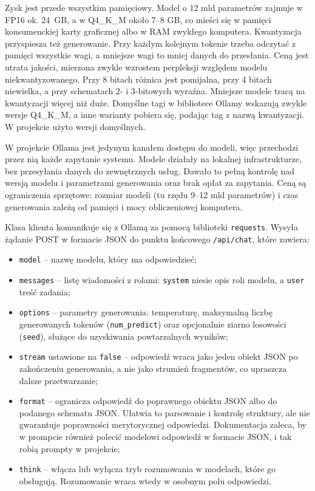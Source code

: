 Zysk jest przede wszystkim pamięciowy. Model o 12 mld parametrów zajmuje w FP16 ok. 24~GB, a w Q4\_K\_M około 7--8 GB, co mieści się w pamięci konsumenckiej karty graficznej albo w RAM zwykłego komputera. Kwantyzacja przyspiesza też generowanie. Przy każdym kolejnym tokenie trzeba odczytać z pamięci wszystkie wagi, a mniejsze wagi to mniej danych do przesłania. Ceną jest utrata jakości, mierzona zwykle wzrostem perpleksji względem modelu niekwantyzowanego. Przy 8 bitach różnica jest pomijalna, przy 4 bitach niewielka, a przy schematach 2- i 3-bitowych wyraźna. Mniejsze modele tracą na kwantyzacji więcej niż duże. Domyślne tagi w bibliotece Ollamy wskazują zwykle wersje Q4\_K\_M, a inne warianty pobiera się, podając tag z nazwą kwantyzacji. W projekcie użyto wersji domyślnych.

W projekcie Ollama jest jedynym kanałem dostępu do modeli, więc przechodzi przez nią każde zapytanie systemu. Modele działały na lokalnej infrastrukturze, bez przesyłania danych do zewnętrznych usług. Dawało to pełną kontrolę nad wersją modelu i parametrami generowania oraz brak opłat za zapytania. Ceną są ograniczenia sprzętowe: rozmiar modeli (tu rzędu 9--12 mld parametrów) i czas generowania zależą od pamięci i mocy obliczeniowej komputera.

Klasa klienta komunikuje się z Ollamą za pomocą biblioteki \texttt{requests}. Wysyła żądanie POST w formacie JSON do punktu końcowego \texttt{/api/chat}, które zawiera:
\begin{itemize}
    \item \texttt{model} -- nazwę modelu, który ma odpowiedzieć;
    \item \texttt{messages} -- listę wiadomości z rolami: \texttt{system} niesie opis roli modelu, a \texttt{user} treść zadania;
    \item \texttt{options} -- parametry generowania: temperaturę, maksymalną liczbę generowanych tokenów (\texttt{num\_predict}) oraz opcjonalnie ziarno losowości (\texttt{seed}), służące do uzyskiwania powtarzalnych wyników;
    \item \texttt{stream} ustawione na \texttt{false} -- odpowiedź wraca jako jeden obiekt JSON po zakończeniu generowania, a nie jako strumień fragmentów, co upraszcza dalsze przetwarzanie;
    \item \texttt{format} -- ogranicza odpowiedź do poprawnego obiektu JSON albo do podanego schematu JSON. Ułatwia to parsowanie i kontrolę struktury, ale nie gwarantuje poprawności merytorycznej odpowiedzi. Dokumentacja zaleca, by w prompcie również polecić modelowi odpowiedź w formacie JSON, i tak robią prompty w projekcie;
    \item \texttt{think} -- włącza lub wyłącza tryb rozumowania w modelach, które go obsługują. Rozumowanie wraca wtedy w osobnym polu odpowiedzi.
\end{itemize}

